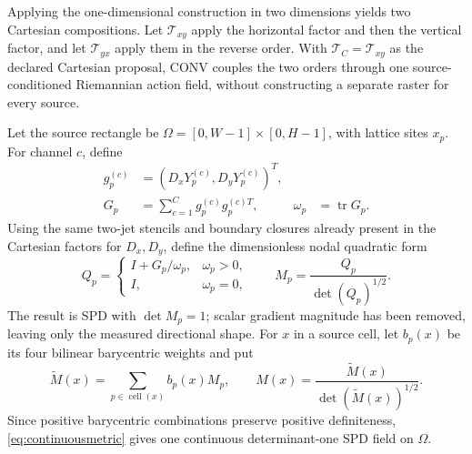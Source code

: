 \documentclass[journal]{IEEEtran}
\newcommand{\Tcal}{\mathcal{T}}
\begin{document}
Applying the one-dimensional construction in two dimensions yields two
Cartesian compositions. Let \(\Tcal_{xy}\) apply the horizontal factor and
then the vertical factor, and let \(\Tcal_{yx}\) apply them in the reverse
order. With \(\Tcal_C=\Tcal_{xy}\) as the declared Cartesian proposal, CONV
couples the two orders through one source-conditioned Riemannian action field,
without constructing a separate raster for every source.

Let the source rectangle be
\(\Omega=[0,W-1]\times[0,H-1]\), with lattice sites \(x_p\). For channel
\(c\), define
\begin{equation}
 \begin{aligned}
 g_p^{(c)}&=(D_xY_p^{(c)},D_yY_p^{(c)})^T,\\
 G_p&=\sum_{c=1}^Cg_p^{(c)}g_p^{(c)T},
 &\omega_p&=\operatorname{tr}G_p .
 \end{aligned}
 \label{eq:witnessjet}
\end{equation}
Using the same two-jet stencils and boundary closures already present in the
Cartesian factors for \(D_x,D_y\), define the dimensionless nodal quadratic
form
\begin{equation}
 Q_p=
 \begin{cases}
 I+G_p/\omega_p,&\omega_p>0,\\
 I,&\omega_p=0,
 \end{cases}
 \qquad
 M_p=\frac{Q_p}{\det(Q_p)^{1/2}}.
 \label{eq:nodalmetric}
\end{equation}
The result is SPD with \(\det M_p=1\); scalar gradient magnitude has been
removed, leaving only the measured directional shape. For \(x\) in a source
cell, let \(b_p(x)\) be its four bilinear barycentric weights and put
\begin{equation}
 \widetilde M(x)=\sum_{p\in\operatorname{cell}(x)}b_p(x)M_p,
 \qquad
 M(x)=\frac{\widetilde M(x)}{\det(\widetilde M(x))^{1/2}}.
 \label{eq:continuousmetric}
\end{equation}
Since positive barycentric combinations preserve positive definiteness,
\eqref{eq:continuousmetric} gives one continuous determinant-one SPD field on
\(\Omega\).
\end{document}
